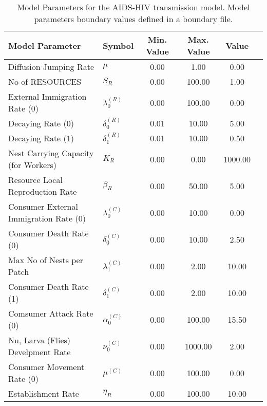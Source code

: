 \begin{table}
\centering
\begin{tabular}{p{5cm}lcccc}
{\bf Model Parameter} & {\bf Symbol} & {\bf Min. Value} & {\bf Max. Value} & {\bf Value}\\
\hline\hline
Diffusion Jumping Rate & $\mu$ & 0.00 & 1.00 & 0.00\\
No of RESOURCES & $S_R$ & 0.00 & 100.00 & 1.00\\
External Immigration Rate (0) & $\lambda^{(R)}_0$ & 0.00 & 100.00 & 0.00\\
Decaying Rate (0) & $\delta^{(R)}_0$ & 0.01 & 10.00 & 5.00\\
Decaying Rate (1) & $\delta^{(R)}_1$ & 0.01 & 10.00 & 0.50\\
Nest Carrying Capacity (for Workers) & $K_R$ & 0.00 & 0.00 & 1000.00\\
Resource Local Reproduction Rate & $\beta_R$ & 0.00 & 50.00 & 5.00\\
Consumer External Immigration Rate (0) & $\lambda^{(C)}_0$ & 0.00 & 10.00 & 0.00\\
Consumer Death Rate (0) & $\delta^{(C)}_0$ & 0.00 & 10.00 & 2.50\\
Max No of Nests per Patch & $\lambda^{(C)}_1$ & 0.00 & 2.00 & 10.00\\
Consumer Death Rate (1) & $\delta^{(C)}_1$ & 0.00 & 2.00 & 10.00\\
Comsumer Attack Rate (0) & $\alpha^{(C)}_0$ & 0.00 & 100.00 & 15.50\\
Nu, Larva (Flies) Develpment Rate & $\nu^{(C)}_0$ & 0.00 & 1000.00 & 2.00\\
Consumer Movement Rate (0) & $\mu^{(C)}$ & 0.00 & 100.00 & 0.00\\
Establishment Rate & $\eta_R$ & 0.00 & 100.00 & 10.00\\
\hline\hline
\end{tabular}
\caption{Model Parameters for the AIDS-HIV transmission model. Model parameters boundary values defined in a boundary file.}
\end{table}
